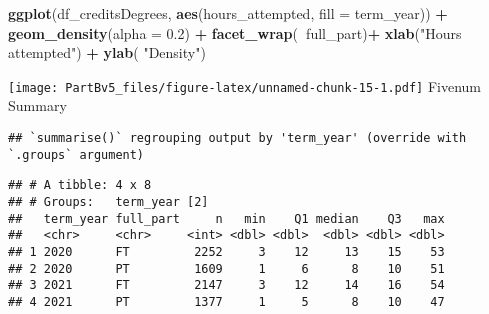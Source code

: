 \documentclass[]{article}
\newenvironment{Shaded}{\begin{snugshade}}{\end{snugshade}}
\newcommand{\DataTypeTok}[1]{\textcolor[rgb]{0.13,0.29,0.53}{#1}}
\newcommand{\DecValTok}[1]{\textcolor[rgb]{0.00,0.00,0.81}{#1}}
\newcommand{\FloatTok}[1]{\textcolor[rgb]{0.00,0.00,0.81}{#1}}
\newcommand{\KeywordTok}[1]{\textcolor[rgb]{0.13,0.29,0.53}{\textbf{#1}}}
\newcommand{\NormalTok}[1]{#1}
\newcommand{\OperatorTok}[1]{\textcolor[rgb]{0.81,0.36,0.00}{\textbf{#1}}}
\newcommand{\StringTok}[1]{\textcolor[rgb]{0.31,0.60,0.02}{#1}}
\begin{document}
\begin{Shaded}
\begin{Highlighting}[]
\KeywordTok{ggplot}\NormalTok{(df_creditsDegrees, }\KeywordTok{aes}\NormalTok{(hours_attempted, }\DataTypeTok{fill =}\NormalTok{ term_year)) }\OperatorTok{+}\StringTok{ }\KeywordTok{geom_density}\NormalTok{(}\DataTypeTok{alpha =} \FloatTok{0.2}\NormalTok{) }\OperatorTok{+}
\StringTok{  }\KeywordTok{facet_wrap}\NormalTok{(}\OperatorTok{~}\NormalTok{full_part)}\OperatorTok{+}
\StringTok{  }\KeywordTok{xlab}\NormalTok{(}\StringTok{"Hours attempted"}\NormalTok{) }\OperatorTok{+}
\StringTok{  }\KeywordTok{ylab}\NormalTok{( }\StringTok{"Density"}\NormalTok{)}
\end{Highlighting}
\end{Shaded}

\texttt{[image: PartBv5\_files/figure-latex/unnamed-chunk-15-1.pdf]}
Fivenum Summary

\begin{Shaded}
\end{Shaded}

\begin{verbatim}
## `summarise()` regrouping output by 'term_year' (override with `.groups` argument)
\end{verbatim}

\begin{verbatim}
## # A tibble: 4 x 8
## # Groups:   term_year [2]
##   term_year full_part     n   min    Q1 median    Q3   max
##   <chr>     <chr>     <int> <dbl> <dbl>  <dbl> <dbl> <dbl>
## 1 2020      FT         2252     3    12     13    15    53
## 2 2020      PT         1609     1     6      8    10    51
## 3 2021      FT         2147     3    12     14    16    54
## 4 2021      PT         1377     1     5      8    10    47
\end{verbatim}
\end{document}
